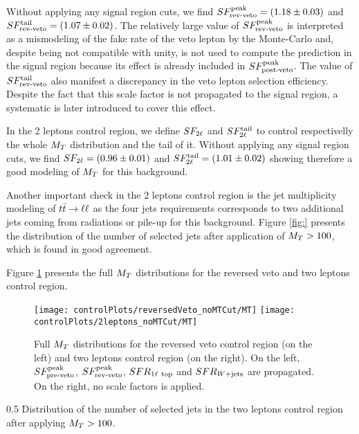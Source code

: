         Without applying any signal region cuts, we find $SF_{\text{rev-veto}}^{\text{peak}} = (1.18 \pm 0.03)$ and 
        $SF_{\text{rev-veto}}^{\text{tail}} = (1.07 \pm 0.02)$. The relatively large value of $SF_{\text{rev-veto}}^{\text{peak}}$ is
        interpreted as a mismodeling of the fake rate of the veto lepton by the Monte-Carlo
        and, despite being not compatible with unity, is not used to compute the prediction
        in the signal region because its effect is already included in $SF_{\text{post-veto}}^{\text{peak}}$. The
        value of $SF_{\text{rev-veto}}^{\text{tail}}$ also manifest a discrepancy in the veto lepton selection
        efficiency. Despite the fact that this scale factor is not propagated to the
        signal region, a systematic is later introduced to cover this effect.

        In the 2 leptons control region, we define $SF_{2\ell}$ and $SF_{2\ell}^{\text{tail}}$ to
        control respectivelly the whole $M_T$ distribution and the tail of it.
        Without applying any signal region cuts, we find $SF_{2\ell} = (0.96 \pm 0.01)$ 
        and $SF_{2\ell}^{\text{tail}} = (1.01 \pm 0.02)$ showing therefore a good modeling of $M_T$
        for this background. 
        
        Another important check in the 2 leptons control region is the jet multiplicity 
        modeling of $t\bar{t} \rightarrow \ell \ell$ as the four jets requirements corresponds to two 
        additional jets coming from radiations or pile-up for this background. 
        Figure \ref{fig:} presents the distribution of the number of selected jets after
        application of $M_T>100$, which is found in good agreement.
         
        Figure \ref{fig:preselMT2leptonAndLepPlusVeto} presents the full $M_T$ 
        distributions for the reversed veto and two leptons control region.

        \begin{figure}[h!]
            \centering
            \texttt{[image: controlPlots/reversedVeto\_noMTCut/MT]}
            \texttt{[image: controlPlots/2leptons\_noMTCut/MT]}
            \caption{Full $M_T$ distributions for the reversed veto control region (on the left) and two leptons control region (on the right). On the left, $SF_{\text{pre-veto}}^{\text{peak}}$, $SF_{\text{rev-veto}}^{\text{peak}}$, $SFR_{1\ell~\text{top}}$ and $SFR_{\text{$W$+jets}}$ are propagated. On the right, no scale factors is applied.}
                    \label{fig:preselMT2leptonAndLepPlusVeto}
        \end{figure}

                     {0.5}
                     {Distribution of the number of selected jets in the two leptons control region after applying $M_T > 100$.}

